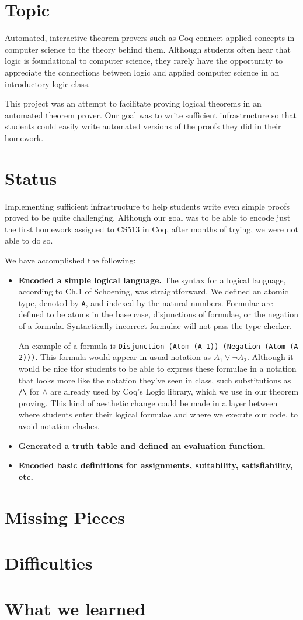 \documentclass{article}
\begin{document}
\section{Topic}
Automated, interactive theorem provers such as Coq connect applied concepts in computer science to the theory behind them. Although students often hear that logic is foundational to computer science, they rarely have the opportunity to appreciate the connections between logic and applied computer science in an introductory logic class. 

This project was an attempt to facilitate proving logical theorems in an automated theorem prover. Our goal was to write sufficient infrastructure so that students could easily write automated versions of the proofs they did in their homework. 
\section{Status}
Implementing sufficient infrastructure to help students write even simple proofs proved to be quite challenging. Although our goal was to be able to encode just the first homework assigned to CS513 in Coq, after months of trying, we were not able to do so.

We have accomplished the following:
\begin{itemize}
\item {\bf Encoded a simple logical language.} The syntax for a logical language, according to Ch.1 of Schoening, was straightforward. We defined an atomic type, denoted by \verb|A|, and indexed by the natural numbers. Formulae are defined to be atoms in the base case, disjunctions of formulae, or the negation of a formula. Syntactically incorrect formulae will not pass the type checker. 

An example of a formula is \verb|Disjunction (Atom (A 1)) (Negation (Atom (A 2)))|. This formula would appear in usual notation as $A_1 \vee \neg A_2$. Although it would be nice tfor students to be able to express these formulae in a notation that looks more like the notation they've seen in class, such substitutions as \verb|/\| for $\wedge$ are already used by Coq's Logic library, which we use in our theorem proving. This kind of aesthetic change could be made in a layer between where students enter their logical formulae and where we execute our code, to avoid notation clashes.

\item {\bf Generated a truth table and defined an evaluation function.} 
\item {\bf Encoded basic definitions for assignments, suitability, satisfiability, etc.}  
\end{itemize}

\section{Missing Pieces}
\section{Difficulties}
\section{What we learned}
\end{document}

